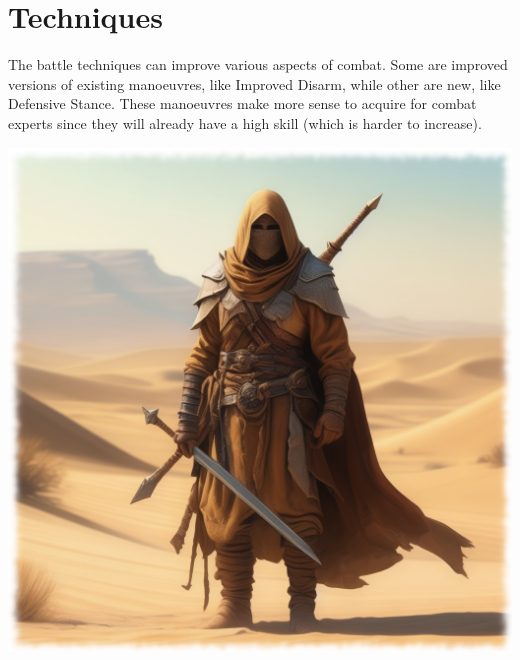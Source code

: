 \section{Techniques}
The battle techniques can improve various aspects of combat. Some are improved versions of existing manoeuvres, like Improved Disarm, while other are new, like Defensive Stance. These manoeuvres make more sense to acquire for combat experts since they will already have a high skill (which is harder to increase).

\begin{center}
\includegraphics[scale=0.23]{img/ai-images/legendary-warrior.png}
\end{center}


